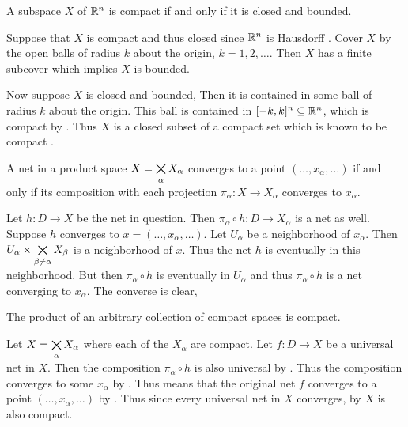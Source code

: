 \documentclass[letterpaper, 11pt, oneside]{book}
\begin{document}
\begin{cor}
  A subspace $X$ of $\mathbb{R}^{n}$ is compact if and only if it is closed and bounded.
\end{cor}
\begin{pf}
  Suppose that $X$ is compact and thus closed since $\mathbb{R}^{n}$ is Hausdorff .
  Cover $X$ by the open balls of radius $k$ about the origin, $k = 1, 2, \ldots$.
  Then $X$ has a finite subcover which implies $X$ is bounded.

  Now suppose $X$ is closed and bounded,
  Then it is contained in some ball of radius $k$ about the origin.
  This ball is contained in $[-k, k]^{n} \subseteq \mathbb{R}^{n}$, which is compact by .
  Thus $X$ is a closed subset of a compact set which is known to be compact .
\end{pf}

\clearpage

\begin{prop}\label{prop: net_of_product_converges}
  A net in a product space $X = \bigtimes\limits_{\alpha} X_{\alpha}$ converges to a point $(\ldots, x_{\alpha}, \ldots)$ if and only if its composition with each projection $\pi_{\alpha}\colon X \to X_{\alpha}$ converges to $x_{\alpha}$.
\end{prop}
\begin{pf}
  Let $h\colon D \to X$ be the net in question.
  Then $\pi_{\alpha} \circ h\colon D \to X_{\alpha}$ is a net as well.
  Suppose $h$ converges to $x = (\ldots, x_{\alpha}, \ldots)$.
  Let $U_{\alpha}$ be a neighborhood of $x_{\alpha}$.
  Then $U_{\alpha} \times \bigtimes\limits_{\beta \neq \alpha} X_{\beta}$ is a neighborhood of $x$.
  Thus the net $h$ is eventually in this neighborhood.
  But then $\pi_{\alpha} \circ h$ is eventually in $U_{\alpha}$ and thus $\pi_{\alpha} \circ h$ is a net converging to $x_{\alpha}$.
  The converse is clear,
\end{pf}

\begin{thrm}\label{thrm: tychonoff}
  The product of an arbitrary collection of compact spaces is compact.
\end{thrm}
\begin{pf}
  Let $X = \bigtimes\limits_{\alpha} X_{\alpha}$ where each of the $X_{\alpha}$ are compact.
  Let $f\colon D \to X$ be a universal net in $X$.
  Then the composition $\pi_{\alpha} \circ h$ is also universal by .
  Thus the composition converges to some $x_{\alpha}$ by .
  Thus means that the original net $f$ converges to a point $(\ldots, x_{\alpha}, \ldots)$ by .
  Thus since every universal net in $X$ converges, by  $X$ is also compact.
\end{pf}
\end{document}
